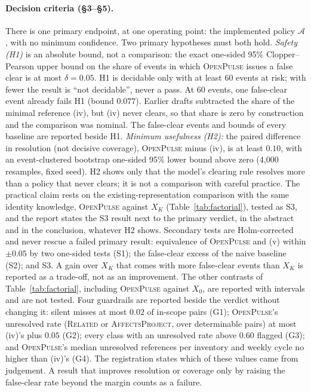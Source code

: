 \documentclass[11pt,a4paper]{article}
\newcommand{\op}{\textsc{OpenPulse}}
\begin{document}
\paragraph{Decision criteria (\S3--\S5).} There is one primary
endpoint, at one operating point: the implemented policy
$\mathcal{A}$, with no minimum confidence. Two primary hypotheses must
both hold. \emph{Safety (H1)} is an absolute bound, not a comparison:
the exact one-sided 95\% Clopper--Pearson upper bound on the share of
events in which \op{} issues a false clear is at most $\delta = 0.05$.
H1 is decidable only with at least 60 events at risk; with fewer the
result is ``not decidable'', never a pass. At 60 events, one
false-clear event already fails H1 (bound $0.077$). Earlier drafts
subtracted the share of the minimal reference (iv), but (iv) never
clears, so that share is zero by construction and the comparison was
nominal. The false-clear events and bounds of every baseline are
reported beside H1. \emph{Minimum usefulness (H2):} the paired
difference in resolution (not decisive coverage), \op{} minus (iv), is
at least $0.10$, with an event-clustered bootstrap one-sided 95\% lower
bound above zero (4{,}000 resamples, fixed seed). H2 shows only that
the model's clearing rule resolves more than a policy that never
clears; it is not a comparison with careful practice. The practical
claim rests on the existing-representation comparison with the same
identity knowledge, \op{} against $X_K$ (Table~\ref{tab:factorial}),
tested as S3, and the report states the S3 result next to the primary
verdict, in the abstract and in the conclusion, whatever H2 shows.
Secondary tests are Holm-corrected and never rescue a failed primary
result: equivalence of \op{} and (v) within $\pm 0.05$ by two
one-sided tests (S1); the false-clear excess of the naive baseline
(S2); and S3. A gain over $X_K$ that comes with more false-clear events
than $X_K$ is reported as a trade-off, not as an improvement. The
other contrasts of Table~\ref{tab:factorial}, including \op{} against
$X_0$, are reported with intervals and are not tested. Four guardrails
are reported beside the verdict without changing it: silent misses at
most $0.02$ of in-scope pairs (G1); \op{}'s unresolved rate
(\textsc{Related} or \textsc{AffectsProject}, over determinable pairs)
at most (iv)'s plus $0.05$ (G2); every class with an unresolved rate
above $0.60$ flagged (G3); and \op{}'s median unresolved references per
inventory and weekly cycle no higher than (iv)'s (G4). The registration
states which of these values came from judgement. A result that
improves resolution or coverage only by raising the false-clear rate
beyond the margin counts as a failure.
\end{document}
